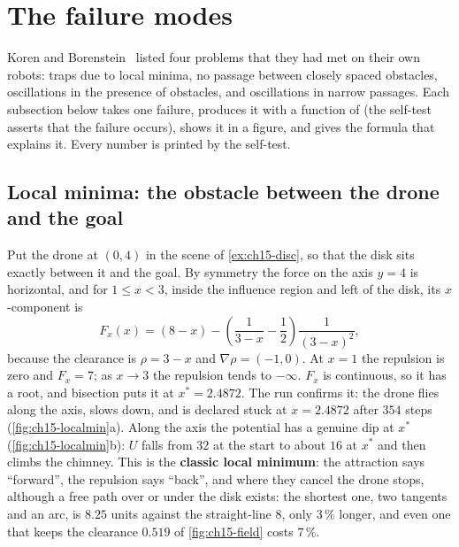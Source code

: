 \section{The failure modes}
\label{sec:ch15-failures}

Koren and Borenstein~\cite{koren1991potential} listed four problems that
they had met on their own robots: traps due to local minima, no passage
between closely spaced obstacles, oscillations in the presence of obstacles,
and oscillations in narrow passages. Each subsection below takes one
failure, produces it with a function of 
(the self-test asserts that the failure occurs), shows it in a figure, and
gives the formula that explains it. Every number is printed by the self-test.

\subsection{Local minima: the obstacle between the drone and the goal}
\label{sec:ch15-localmin}

Put the drone at $(0, 4)$ in the scene of \cref{ex:ch15-disc}, so that the
disk sits exactly between it and the goal. By symmetry the force on the axis
$y = 4$ is horizontal, and for $1 \le x < 3$, inside the influence region
and left of the disk, its $x$-component is
\begin{equation}
  F_x(x) = (8 - x) - \left( \frac{1}{3 - x} - \frac{1}{2} \right) \frac{1}{(3 - x)^2},
  \label{eq:ch15-axis}
\end{equation}
because the clearance is $\rho = 3 - x$ and $\nabla\rho = (-1, 0)$. At $x = 1$
the repulsion is zero and $F_x = 7$; as $x \to 3$ the repulsion tends to
$-\infty$. $F_x$ is continuous, so it has a root, and bisection puts it at
$x^* = 2.4872$. The run  confirms it: the drone
flies along the axis, slows down, and is declared stuck at $x = 2.4872$
after $354$ steps (\cref{fig:ch15-localmin}a). Along the axis the potential
has a genuine dip at $x^*$ (\cref{fig:ch15-localmin}b): $U$ falls from $32$
at the start to about $16$ at $x^*$ and then climbs the chimney. This is
the \textbf{classic local
minimum}: the attraction says ``forward'', the repulsion says ``back'', and
where they cancel the drone stops, although a free path over or under the
disk exists: the shortest one, two tangents and an arc, is $8.25$ units
against the straight-line $8$, only $3\,\%$ longer, and even one that keeps
the clearance $0.519$ of \cref{fig:ch15-field} costs $7\,\%$.

